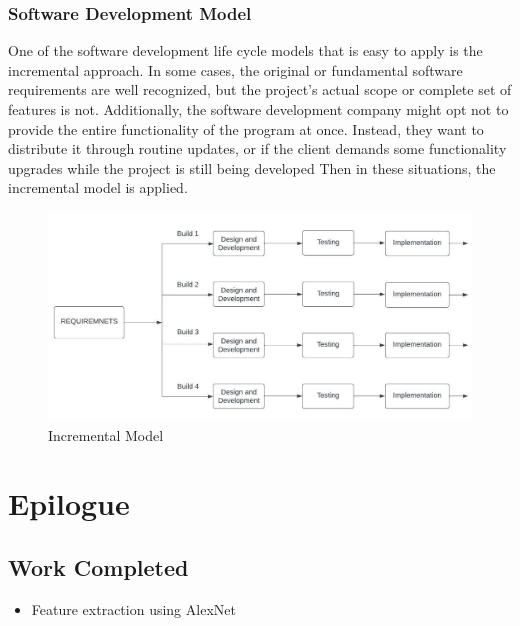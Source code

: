 \subsection{Software Development Model}
\vspace{-18pt}
One of the software development life cycle models that is easy to apply is the incremental approach. In some cases, the original or fundamental software requirements are well recognized, but the project's actual scope or complete set of features is not. Additionally, the software development company might opt not to provide the entire functionality of the program at once. Instead, they want to distribute it through routine updates, or if the client demands some functionality upgrades while the project is still being developed Then in these situations, the incremental model is applied.
 \begin{figure}[tbh] %
\begin{center}
	\includegraphics[width=5in]{images/sdlc1.jpg} 
	\caption{Incremental Model} %
	\label{Incremental Model} %
\end{center}
\end{figure}

\chapter{Epilogue}
\vspace{-18pt}
\section{Work Completed}
\vspace{-18pt}
\begin{itemize}
\item Feature extraction using AlexNet
\end{itemize}
